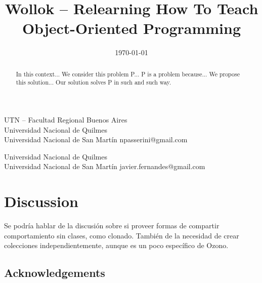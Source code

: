 \documentclass[preprint,10pt]{sigplanconf}
\begin{document}
\title{Wollok -- Relearning How To Teach Object-Oriented Programming}
  {UTN -- Facultad Regional Buenos Aires \\ Universidad Nacional de Quilmes \\ Universidad Nacional de San Martín}
  {npasserini@gmail.com}
  
  {Universidad Nacional de Quilmes \\ Universidad Nacional de San Martín}
  {javier.fernandes@gmail.com}

\date{\today}
\maketitle

\begin{abstract}
In this context...
We consider this problem P...
P is a problem because...
We propose this solution...
Our solution solves P in such and such way.
\end{abstract}





\section{Discussion}
\label{sec:discussion}


Se podría hablar de la discusión sobre si proveer formas de compartir comportamiento sin clases, como clonado.
También de la necesidad de crear colecciones independientemente, aunque es un poco específico de Ozono.







\subsection*{Acknowledgements} 
\end{document}
